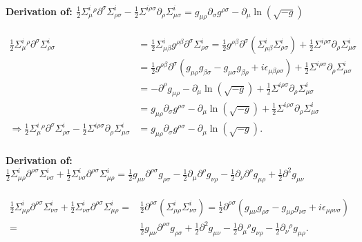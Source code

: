 \documentclass[10pt]{report}
\theoremstyle{definition}
\begin{document}
        \paragraph{Derivation of: \texorpdfstring{$\frac{1}{2}\Sigma^i_\mu{}^\rho \partial^\sigma \Sigma^i_{\rho\sigma} - \frac{1}{2}\Sigma^{i\rho\sigma} \partial_\rho \Sigma^i_{\mu\sigma} = g_{\mu\rho} \partial_\sigma g^{\rho\sigma} - \partial_\mu \ln(\sqrt{-g})$}{PDFstring}}
        \begin{align}
            \frac{1}{2}\Sigma^i_\mu{}^\rho \partial^\sigma \Sigma^i_{\rho\sigma} &= \frac{1}{2}\Sigma^i_{\mu\beta} g^{\rho\beta} \partial^\sigma \Sigma^i_{\rho\sigma} = \frac{1}{2} g^{\rho\beta} \partial^\sigma \left( \Sigma^i_{\mu\beta} \Sigma^i_{\rho\sigma} \right) + \frac{1}{2}\Sigma^{i\rho\sigma} \partial_\rho \Sigma^i_{\mu\sigma} \nonumber\\ &= \frac{1}{2} g^{\rho\beta} \partial^\sigma \left( g_{\mu\rho} g_{\beta\sigma} - g_{\mu\sigma} g_{\beta\rho} + i \epsilon_{\mu\beta\rho\sigma} \right) + \frac{1}{2}\Sigma^{i\rho\sigma} \partial_\rho \Sigma^i_{\mu\sigma} \nonumber\\ &= -\partial^\rho g_{\mu\rho} - \partial_\mu \ln(\sqrt{-g}) + \frac{1}{2}\Sigma^{i\rho\sigma} \partial_\rho \Sigma^i_{\mu\sigma} \nonumber\\ &= g_{\mu\rho} \partial_\sigma g^{\rho\sigma} - \partial_\mu \ln(\sqrt{-g}) + \frac{1}{2}\Sigma^{i\rho\sigma} \partial_\rho \Sigma^i_{\mu\sigma} \nonumber\\[10pt]
            \Rightarrow \frac{1}{2} \Sigma^i_\mu{}^\rho \partial^\sigma \Sigma^i_{\rho\sigma} - \frac{1}{2}\Sigma^{i\rho\sigma} \partial_\rho \Sigma^i_{\mu\sigma} &= g_{\mu\rho} \partial_\sigma g^{\rho\sigma} - \partial_\mu \ln(\sqrt{-g}).
        \end{align}

        \paragraph{Derivation of: \texorpdfstring{$\frac{1}{2}\Sigma^i_{\mu\rho} \partial^{\rho\sigma} \Sigma^i_{\nu\sigma} + \frac{1}{2}\Sigma^i_{\nu\sigma} \partial^{\rho\sigma} \Sigma^i_{\mu\rho} = \frac{1}{2}g_{\mu\nu} \partial^{\rho\sigma} g_{\rho\sigma} - \frac{1}{2}\partial_\mu \partial^\rho g_{\nu\rho} - \frac{1}{2} \partial_\nu \partial^\rho g_{\mu\rho} + \frac{1}{2}\partial^2 g_{\mu\nu}$}{PDFString}}
        \begin{align}
            \frac{1}{2}\Sigma^i_{\mu\rho} \partial^{\rho\sigma} \Sigma^i_{\nu\sigma} + \frac{1}{2}\Sigma^i_{\nu\sigma} \partial^{\rho\sigma} \Sigma^i_{\mu\rho} =& \frac{1}{2} \partial^{\rho\sigma}\left( \Sigma^i_{\mu\rho} \Sigma^i_{\nu\sigma} \right) = \frac{1}{2} \partial^{\rho\sigma} \left( g_{\mu\nu} g_{\rho\sigma} - g_{\mu\rho} g_{\nu\sigma} + i \epsilon_{\mu\rho\nu\sigma} \right) \nonumber\\ =& \frac{1}{2} g_{\mu\nu} \partial^{\rho\sigma} g_{\rho\sigma} + \frac{1}{2} \partial^2 g_{\mu\nu} - \frac{1}{2}\partial_\mu{}^\rho g_{\nu\rho} - \frac{1}{2}\partial_\nu{}^\rho g_{\mu\rho}.
        \end{align}
\end{document}
